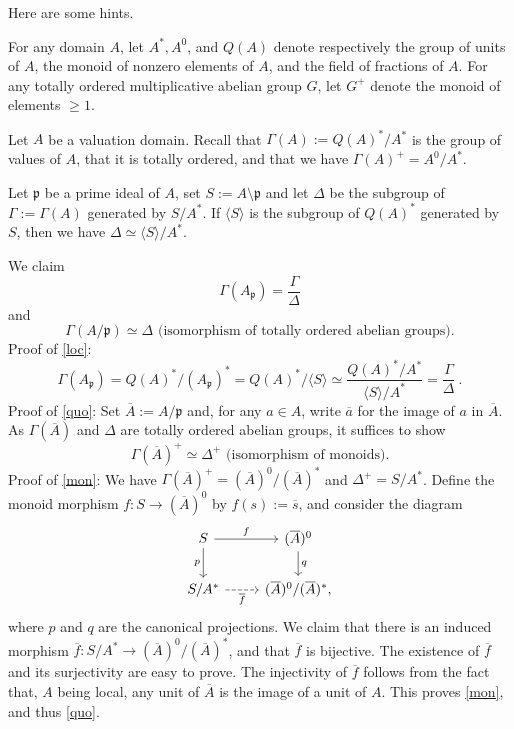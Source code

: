 \documentclass[parskip=half,fontsize=12pt]{scrartcl}%
\newcommand{\mf}{\mathfrak}
\newcommand{\ppp}{\mf p}
\begin{document}
Here are some hints.

For any domain $A$, let $A^*,A^0$, and $Q(A)$ denote respectively the group of units of $A$, the monoid of nonzero elements of $A$, and the field of fractions of $A$. For any totally ordered multiplicative abelian group $G$, let $G^+$ denote the monoid of elements $\ge1$. 

Let $A$ be a valuation domain. Recall that $\Gamma(A):=Q(A)^*/A^*$ is the group of values of $A$, that it is totally ordered, and that we have $\Gamma(A)^+=A^0/A^*$. 

Let $\ppp$ be a prime ideal of $A$, set $S:=A\setminus\ppp$ and let $\Delta$ be the subgroup of $\Gamma:=\Gamma(A)$ generated by $S/A^*$. If $\langle S\rangle$ is the subgroup of $Q(A)^*$ generated by $S$, then we have $\Delta\simeq\langle S\rangle/A^*$.

We claim 
\begin{equation}\label{loc}
\Gamma(A_\ppp)=\frac{\Gamma}{\Delta}
\end{equation}
and 
\begin{equation}\label{quo}
\Gamma(A/\ppp)\simeq\Delta\text{ (isomorphism of totally ordered abelian groups).}
\end{equation}
Proof of \eqref{loc}:
$$
\Gamma(A_\ppp)=Q(A)^*/(A_\ppp)^*=Q(A)^*/\langle S\rangle\simeq\frac{Q(A)^*/A^*}{\langle S\rangle/A^*}=\frac{\Gamma}{\Delta}\ .
$$ 
Proof of \eqref{quo}: Set $\overline A:=A/\ppp$ and, for any $a\in A$, write $\overline a$ for the image of $a$ in $\overline A$. %
As $\Gamma(\overline A)$ and $\Delta$ are totally ordered abelian groups, it suffices to show 
\begin{equation}\label{mon}
\Gamma(\overline A)^+\simeq\Delta^+\text{ (isomorphism of monoids).}
\end{equation}
Proof of \eqref{mon}: We have $\Gamma(\overline A)^+=(\overline A)^0/(\overline A)^*$ and $\Delta^+=S/A^*$. Define the monoid morphism $f:S\to(\overline A)^0$ by $f(s):=\overline s$, and consider the diagram 
$$
\begin{tikzcd}
S\ar[r,"f"]\ar[d,"p"']&(\overline A)^0\ar[d,"q"]\\ 
S/A^*\ar[r,dashrightarrow,"\overline f"']&(\overline A)^0/(\overline A)^*,
\end{tikzcd}
$$ 
where $p$ and $q$ are the canonical projections. We claim that there is an induced morphism $\overline f:S/A^*\to(\overline A)^0/(\overline A)^*$, and that $\overline f$ is bijective. The existence of $\overline f$ and its surjectivity are easy to prove. The injectivity of $\overline f$ follows from the fact that, $A$ being local, any unit of $\overline A$ is the image of a unit of $A$. This proves \eqref{mon}, and thus \eqref{quo}.
\end{document}
